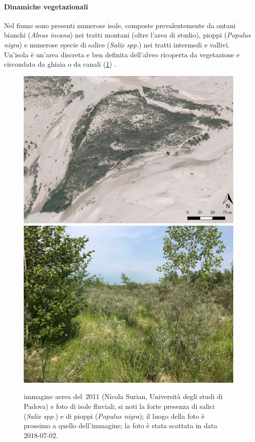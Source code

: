 \paragraph{Dinamiche vegetazionali}
Nel fiume sono presenti numerose isole, composte prevalentemente da ontani bianchi (\emph{Alnus incana}) nei tratti montani (oltre l'area di studio), pioppi (\emph{Populus nigra}) e numerose specie di salice (\emph{Salix spp.}) nei tratti intermedi e vallivi.
Un'isola è un'area discreta e ben definita dell'alveo ricoperta da vegetazione e circondata da ghiaia o da canali (\cref{fig:esempio-isola}) .
%
\begin{figure}
	\centering
	\includegraphics[width = \textwidth]{files/esempio_isola_sat_1.jpeg}
	\\[0.2cm]
	\includegraphics[width = \textwidth]{files/esempio_isola_1.jpg}
	\caption[immagine e foto di isole fluviali]{immagine aerea del~2011 (Nicola Surian, Università degli studi di Padova) e foto di isole fluviali; si noti la forte presenza di salici (\emph{Salix spp.}) e di pioppi (\emph{Populus nigra}); il luogo della foto è prossimo a quello dell'immagine; la foto è stata scattata in data 2018-07-02.}
	\label{fig:esempio-isola}
\end{figure}
